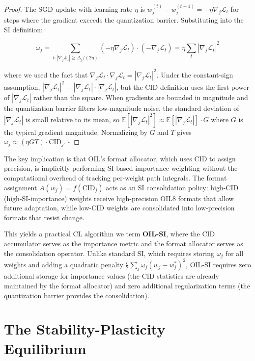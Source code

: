 \begin{proof}
The SGD update with learning rate $\eta$ is $w_j^{(t)} - w_j^{(t-1)} = -\eta \nabla_j \mathcal{L}_t$ for steps where the gradient exceeds the quantization barrier. Substituting into the SI definition:

$$\omega_j = \sum_{t: |\nabla_j \mathcal{L}_t| \geq \Delta_j/(2\eta)} (-\eta \nabla_j \mathcal{L}_t) \cdot (-\nabla_j \mathcal{L}_t) = \eta \sum_{t} |\nabla_j \mathcal{L}_t|^2$$

where we used the fact that $\nabla_j \mathcal{L}_t \cdot \nabla_j \mathcal{L}_t = |\nabla_j \mathcal{L}_t|^2$. Under the constant-sign assumption, $|\nabla_j \mathcal{L}_t|^2 = |\nabla_j \mathcal{L}_t| \cdot |\nabla_j \mathcal{L}_t|$, but the CID definition uses the first power of $|\nabla_j \mathcal{L}_t|$ rather than the square. When gradients are bounded in magnitude and the quantization barrier filters low-magnitude noise, the standard deviation of $|\nabla_j \mathcal{L}_t|$ is small relative to its mean, so $\mathbb{E}[|\nabla_j \mathcal{L}_t|^2] \approx \mathbb{E}[|\nabla_j \mathcal{L}_t|] \cdot G$ where $G$ is the typical gradient magnitude. Normalizing by $G$ and $T$ gives $\omega_j \approx (\eta G T) \cdot \text{CID}_j$. $\square$
\end{proof}

The key implication is that OIL's format allocator, which uses CID to assign precision, is implicitly performing SI-based importance weighting without the computational overhead of tracking per-weight path integrals. The format assignment $A(w_j) = f(\text{CID}_j)$ acts as an SI consolidation policy: high-CID (high-SI-importance) weights receive high-precision OIL8 formats that allow future adaptation, while low-CID weights are consolidated into low-precision formats that resist change.

This yields a practical CL algorithm we term \textbf{OIL-SI}, where the CID accumulator serves as the importance metric and the format allocator serves as the consolidation operator. Unlike standard SI, which requires storing $\omega_j$ for all weights and adding a quadratic penalty $\frac{c}{2} \sum_j \omega_j (w_j - w_j^*)^2$, OIL-SI requires zero additional storage for importance values (the CID statistics are already maintained by the format allocator) and zero additional regularization terms (the quantization barrier provides the consolidation).

\section{The Stability-Plasticity Equilibrium}
\label{sec:sp_equilibrium}

